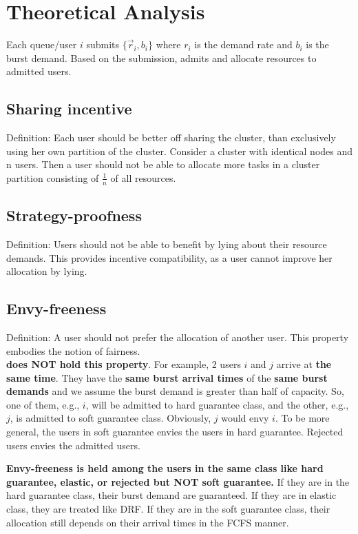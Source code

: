 \section{Theoretical Analysis}

Each queue/user $i$ submits $\{\vec{r}_i, b_i\}$ where $r_i$ is the demand rate and $b_i$ is the burst demand. Based on the submission, \name admits and allocate resources to admitted users.

\subsection{Sharing incentive}

Definition: Each user should be better off sharing the cluster, than exclusively using her own partition of the cluster. Consider a cluster with identical nodes and n users. Then a user should not be able to allocate more tasks in a cluster partition consisting of $\frac{1}{n}$ of all resources.

\subsection{Strategy-proofness}

Definition: Users should not be able to
benefit by lying about their resource demands. This
provides incentive compatibility, as a user cannot
improve her allocation by lying.

\subsection{Envy-freeness}

Definition: A user should not prefer the allocation of another user. This property embodies the notion of fairness.\\

\textbf{\name does NOT hold this property}. For example, 2 users $i$ and $j$ arrive at \textbf{the same time}. They have the \textbf{same burst arrival times} of the \textbf{same burst demands} and we assume the burst demand is greater than half of capacity. So, one of them, e.g., $i$, will be admitted to hard guarantee class, and the other, e.g., $j$, is admitted to soft guarantee class. Obviously, $j$ would envy $i$. To be more general, the users in soft guarantee envies the users in hard guarantee. Rejected users envies the admitted users.

\textbf{Envy-freeness is held among the users in the same class like hard guarantee, elastic, or rejected but NOT soft guarantee.} If they are in the hard guarantee class, their burst demand are guaranteed. If they are in elastic class, they are treated like DRF. If they are in the soft guarantee class, their allocation still depends on their arrival times in the FCFS manner. 

